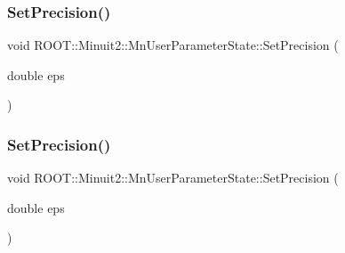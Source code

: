 \subsubsection{\texorpdfstring{SetPrecision()}{SetPrecision()}\hspace{0.1cm}{\footnotesize\ttfamily [1/2]}}
{\footnotesize\ttfamily void R\+O\+O\+T\+::\+Minuit2\+::\+Mn\+User\+Parameter\+State\+::\+Set\+Precision (\begin{DoxyParamCaption}\item[{double}]{eps }\end{DoxyParamCaption})}

\mbox{\label{classROOT_1_1Minuit2_1_1MnUserParameterState_aab7787768e533471839387ef51a75cbb}} 
\subsubsection{\texorpdfstring{SetPrecision()}{SetPrecision()}\hspace{0.1cm}{\footnotesize\ttfamily [2/2]}}
{\footnotesize\ttfamily void R\+O\+O\+T\+::\+Minuit2\+::\+Mn\+User\+Parameter\+State\+::\+Set\+Precision (\begin{DoxyParamCaption}\item[{double}]{eps }\end{DoxyParamCaption})}


